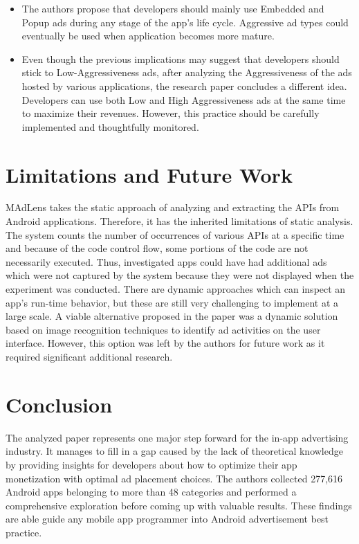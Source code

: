 \documentclass[conference]{IEEEtran}
\begin{document}
\begin{itemize}
\item The authors propose that developers should mainly use Embedded and Popup ads during any stage of the app's life cycle. Aggressive ad types could eventually be used when application becomes more mature.
\item Even though the previous implications may suggest that developers should stick to Low-Aggressiveness ads, after analyzing the Aggressiveness of the ads hosted by various applications, the research paper concludes a different idea. Developers can use both Low and High Aggressiveness ads at the same time to maximize their revenues. However, this practice should be carefully implemented and thoughtfully monitored.
\end{itemize}
\section{Limitations and Future Work}
\label{SectionSix}
MAdLens takes the static approach of analyzing and extracting the APIs from Android applications. Therefore, it has the inherited limitations of static analysis. The system counts the number of occurrences of various APIs at a specific time and because of the code control flow, some portions of the code are not necessarily executed. Thus, investigated apps could have had additional ads which were not captured by the system because they were not displayed when the experiment was conducted. There are dynamic approaches which can inspect an app’s run-time behavior, but these are still very challenging to implement at a large scale. A viable alternative proposed in the paper was a dynamic solution based on image recognition techniques to identify ad activities on the user interface. However, this option was left by the authors for future work as it required significant additional research.

\section{Conclusion}
\label{SectionSeven}
The analyzed paper represents one major step forward for the in-app advertising industry. It manages to fill in a gap caused by the lack of theoretical knowledge by providing insights for developers about how to optimize their app monetization with optimal ad placement choices. The authors collected 277,616 Android apps belonging to more than 48 categories and performed a comprehensive exploration before coming up with valuable results. These findings are able guide any mobile app programmer into Android advertisement best practice.





\end{document}
